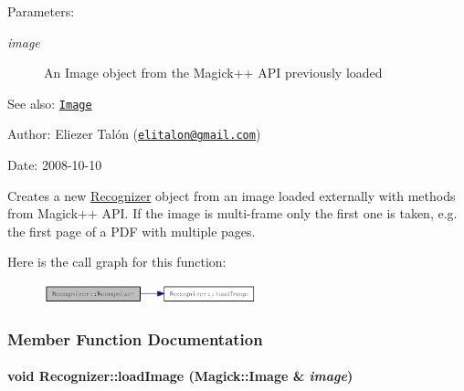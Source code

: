 \begin{Desc}
\item[Parameters:]
\begin{description}
\item[{\em image}]An Image object from the Magick++ API previously loaded\end{description}
\end{Desc}
\begin{Desc}
\item[See also:]\href{http://www.imagemagick.org/Magick++/Image.html}{\tt Image}\end{Desc}
\begin{Desc}
\item[Author:]Eliezer Talón (\href{mailto:elitalon@gmail.com}{\tt elitalon@gmail.com}) \end{Desc}
\begin{Desc}
\item[Date:]2008-10-10\end{Desc}
Creates a new \hyperlink{class_recognizer}{Recognizer} object from an image loaded externally with methods from Magick++ API. If the image is multi-frame only the first one is taken, e.g. the first page of a PDF with multiple pages. 

Here is the call graph for this function:\nopagebreak
\begin{figure}[H]
\begin{center}
\leavevmode
\includegraphics[width=175pt]{class_recognizer_01e0b85a6ad9cfbf6fcab4fe4b294640_cgraph}
\end{center}
\end{figure}


\subsubsection{Member Function Documentation}
\hypertarget{class_recognizer_acc4244738f2577a0c344c3b3af22eb0}{
\paragraph[{loadImage}]{\setlength{\rightskip}{0pt plus 5cm}void Recognizer::loadImage (Magick::Image \& {\em image})}\hfill}
\label{class_recognizer_acc4244738f2577a0c344c3b3af22eb0}


